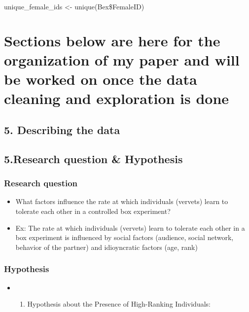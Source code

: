 \documentclass[
]{article}
\providecommand{\tightlist}{%
  \setlength{\itemsep}{0pt}\setlength{\parskip}{0pt}}
\begin{document}
unique\_female\_ids \textless- unique(Bex\$FemaleID)

\hypertarget{sections-below-are-here-for-the-organization-of-my-paper-and-will-be-worked-on-once-the-data-cleaning-and-exploration-is-done}{%
\section{Sections below are here for the organization of my paper and
will be worked on once the data cleaning and exploration is
done}\label{sections-below-are-here-for-the-organization-of-my-paper-and-will-be-worked-on-once-the-data-cleaning-and-exploration-is-done}}

\hypertarget{describing-the-data}{%
\subsection{5. Describing the data}\label{describing-the-data}}

\hypertarget{research-question-hypothesis}{%
\subsection{5.Research question \&
Hypothesis}\label{research-question-hypothesis}}

\hypertarget{research-question}{%
\subsubsection{Research question}\label{research-question}}

\begin{itemize}
\item
  What factors influence the rate at which individuals (vervets) learn
  to tolerate each other in a controlled box experiment?
\item
  Ex: The rate at which individuals (vervets) learn to tolerate each
  other in a box experiment is influenced by social factors (audience,
  social network, behavior of the partner) and idioyncratic factors
  (age, rank)
\end{itemize}

\hypertarget{hypothesis}{%
\subsubsection{Hypothesis}\label{hypothesis}}

\begin{itemize}
\item
  \begin{enumerate}
  \def\labelenumi{\arabic{enumi}.}
  \tightlist
  \item
    Hypothesis about the Presence of High-Ranking Individuals:
  \end{enumerate}
\end{itemize}
\end{document}
